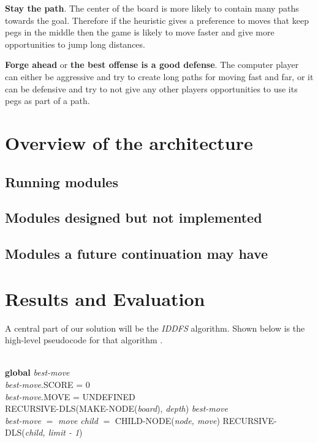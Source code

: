 \documentclass[a4paper,11pt]{article}
\begin{document}
\textbf{Stay the path}. The center of the board is more likely to
contain many paths towards the goal. Therefore if the heuristic gives
a preference to moves that keep pegs in the middle then the game is
likely to move faster and give more opportunities to jump long
distances.

\textbf{Forge ahead} or \textbf{the best offense is a good defense}.
The computer player can either be aggressive and try to create long
paths for moving fast and far, or it can be defensive and try to not
give any other players opportunities to use its pegs as part of a
path.

\section{Overview of the architecture}
\subsection{Running modules }
\subsection{Modules designed but not implemented}
\subsection{Modules a future continuation may have}

\section{Results and Evaluation}

A central part of our solution will be the \emph{IDDFS} algorithm.
Shown below is the
high-level pseudocode for that algorithm \cite{aimodern}.\\
\begin{algorithmic}
 \\
\textbf{global} \emph{best-move} \\
\emph{best-move}.SCORE = 0 \\
\emph{best-move}.MOVE = UNDEFINED \\
\State RECURSIVE-DLS(MAKE-NODE(\emph{board}), \emph{depth})
\State \Return \emph{best-move}
\EndIf
\EndFor
\EndFunction
\\
\State \emph{best-move} $=$ \emph{move}
\EndIf
\State \emph{child} $=$ CHILD-NODE(\emph{node, move})
\State RECURSIVE-DLS(\emph{child, limit - 1})
\EndFor
\EndIf
\EndFunction
\end{algorithmic}
\end{document}
